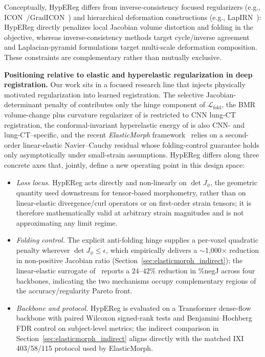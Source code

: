 \documentclass[jimaging,article,submit,pdftex,moreauthors]{Definitions/mdpi}
\begin{document}
Conceptually, HypEReg differs from inverse-consistency focused regularizers (e.g., ICON~\cite{greer2021icon}/GradICON~\cite{tian2023gradicon}) and hierarchical deformation constructions (e.g., LapIRN~\cite{mok2020lapirn}): HypEReg directly penalizes local Jacobian volume distortion and folding in the objective, whereas inverse-consistency methods target cycle/inverse agreement and Laplacian-pyramid formulations target multi-scale deformation composition. These constraints are complementary rather than mutually exclusive.

\noindent\textbf{Positioning relative to elastic and hyperelastic regularization in deep registration.}
Our work sits in a focused research line that injects physically motivated regularization into learned registration. The selective Jacobian-determinant penalty of \citet{mok2020fast} contributes only the hinge component of $\mathcal{L}_{\mathrm{fold}}$, the BMR volume-change plus curvature regularizer of \citet{hering2021lung} is restricted to CNN lung-CT registration, the conformal-invariant hyperelastic energy of \citet{zou2023conformal} is also CNN- and lung-CT--specific, and the recent \emph{ElasticMorph} framework~\cite{elasticmorph2025} relies on a second-order linear-elastic Navier--Cauchy residual whose folding-control guarantee holds only asymptotically under small-strain assumptions. HypEReg differs along three concrete axes that, jointly, define a new operating point in this design space:
\begin{itemize}\setlength\itemsep{2pt}
\item \emph{Loss locus.} HypEReg acts directly and non-linearly on $\det J_\phi$, the geometric quantity used downstream for tensor-based morphometry, rather than on linear-elastic divergence/curl operators or on first-order strain tensors; it is therefore mathematically valid at arbitrary strain magnitudes and is not approximating any limit regime.
\item \emph{Folding control.} The explicit anti-folding hinge supplies a per-voxel quadratic penalty wherever $\det J_\phi\le\epsilon$, which empirically delivers a $\sim$1{,}000$\times$ reduction in non-positive Jacobian ratio (Section~\ref{sec:elasticmorph_indirect}); the linear-elastic surrogate of~\cite{elasticmorph2025} reports a $24$--$42\%$ reduction in $\%$negJ across four backbones, indicating the two mechanisms occupy complementary regions of the accuracy/regularity Pareto front.
\item \emph{Backbone and protocol.} HypEReg is evaluated on a Transformer dense-flow backbone with paired Wilcoxon signed-rank tests and Benjamini--Hochberg FDR control on subject-level metrics; the indirect comparison in Section~\ref{sec:elasticmorph_indirect} aligns directly with the matched IXI 403/58/115 protocol used by ElasticMorph.
\end{itemize}
\end{document}
